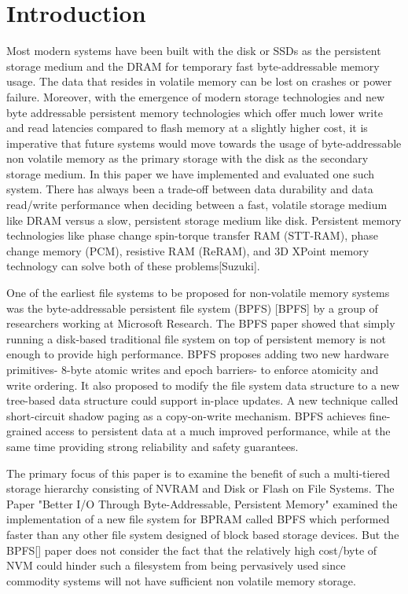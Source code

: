 \section{Introduction}
\label{sec-intro}
Most modern systems have been built with the disk or SSDs as the persistent storage medium and the DRAM for temporary fast byte-addressable memory usage. The data that resides in volatile memory can be lost on crashes or power failure. Moreover, with the emergence of modern storage technologies and new byte addressable persistent memory technologies which offer much lower write and read latencies compared to flash memory at a slightly higher cost, it is imperative that future systems would move towards the usage of byte-addressable non volatile memory as the primary storage with the disk as the secondary storage medium. In this paper we have implemented and evaluated one such system. There has always been a trade-off between data durability and data read/write performance when deciding between a fast, volatile storage medium like DRAM versus a slow, persistent storage medium like disk. Persistent memory technologies like phase change spin-torque transfer RAM (STT-RAM), phase change memory (PCM), resistive RAM (ReRAM), and 3D XPoint memory technology can solve both of these problems[Suzuki].

One of the earliest file systems to be proposed for non-volatile memory systems was the byte-addressable persistent file system (BPFS) [BPFS] by a group of researchers working at Microsoft Research. The BPFS paper showed that simply running a disk-based traditional file system on top of persistent memory is not enough to provide high performance. BPFS proposes adding two new hardware primitives- 8-byte atomic writes and epoch barriers- to enforce atomicity and write ordering. It also proposed to modify the file system data structure to a new tree-based data structure  could support in-place updates. A new technique called short-circuit shadow paging as a copy-on-write mechanism. BPFS achieves fine-grained access to persistent data at a much improved performance, while at the same time providing strong reliability and safety guarantees.

The primary focus of this paper is to examine the benefit of such a multi-tiered storage hierarchy consisting of NVRAM and Disk or Flash on File Systems. The Paper "Better I/O Through Byte-Addressable, Persistent Memory" examined the implementation of a new file system for BPRAM called BPFS which performed faster than any other file system designed of block based storage devices. But the BPFS[] paper does not consider the fact that the relatively high cost/byte of NVM could hinder such a filesystem from being pervasively used since commodity systems will not have sufficient non volatile memory storage.

